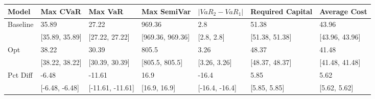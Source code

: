 \begin{tabular}{lllllll}
\toprule
   Model &       Max CVaR &          Max VaR &      Max SemiVar & $|VaR_2 - VaR_1|$ & Required Capital &   Average Cost \\
\midrule
Baseline &          35.89 &            27.22 &           969.36 &               2.8 &            51.38 &          43.96 \\
         & [35.89, 35.89] &   [27.22, 27.22] & [969.36, 969.36] &        [2.8, 2.8] &   [51.38, 51.38] & [43.96, 43.96] \\
     Opt &          38.22 &            30.39 &            805.5 &              3.26 &            48.37 &          41.48 \\
         & [38.22, 38.22] &   [30.39, 30.39] &   [805.5, 805.5] &      [3.26, 3.26] &   [48.37, 48.37] & [41.48, 41.48] \\
Pct Diff &          -6.48 &           -11.61 &             16.9 &             -16.4 &             5.85 &           5.62 \\
         & [-6.48, -6.48] & [-11.61, -11.61] &     [16.9, 16.9] &    [-16.4, -16.4] &     [5.85, 5.85] &   [5.62, 5.62] \\
\bottomrule
\end{tabular}
